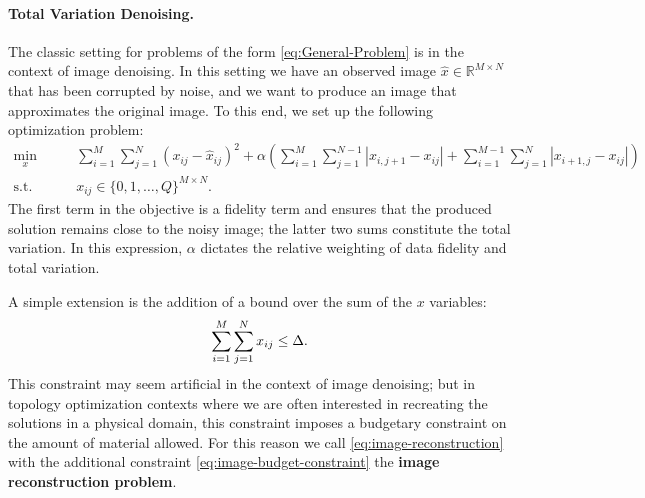 \documentclass[pdflatex,sn-mathphys-num]{sn-jnl}%
\newcommand{\Dominic}[1]{\textcolor{blue}{[Dominic: #1]}}
\begin{document}
\paragraph{Total Variation Denoising.}

The classic setting for problems of the form \eqref{eq:General-Problem} is in the context of image denoising. In this setting we have an observed image $\hat{x} \in \mathbb{R}^{M\times N}$ that has been corrupted by  noise, and we want to produce an image that approximates the original image. To this end, we set up the following optimization problem:
\begin{subequations}
\begin{align}
    \min_{x} \qquad & \sum_{i=1}^{M}\sum_{j=1}^N (x_{ij} - \hat{x}_{ij})^2 + \alpha\left(\sum_{i=1}^{M}\sum_{j=1}^{N-1} |x_{i,j+1} - x_{ij}| + \sum_{i=1}^{M-1}\sum_{j=1}^N |x_{i+1,j} - x_{ij}|\right) \\
    \text{s.t.} \qquad & x_{ij} \in \{0,1,\ldots,Q\}^{M \times N}.
\end{align} \label{eq:image-reconstruction}%
\end{subequations}
The first term in the objective is a fidelity term and ensures that the produced solution remains close to the noisy image;  the latter two sums constitute the total variation. In this expression, $\alpha$ dictates the relative weighting of data fidelity and total variation. 

A simple extension is the addition of a bound over the sum of the $x$ variables:
\begin{equation}
    \sum_{i=1}^M\sum_{j=1}^N x_{ij} \le \Delta . \label{eq:image-budget-constraint}\\
\end{equation}
This constraint may seem artificial in the context of image denoising; but in topology optimization contexts where we are often interested in recreating the solutions in a physical domain, this constraint imposes a budgetary constraint on the amount of material allowed. For this reason we call \eqref{eq:image-reconstruction} with the additional constraint \eqref{eq:image-budget-constraint} the \textbf{image reconstruction problem}.
\end{document}
